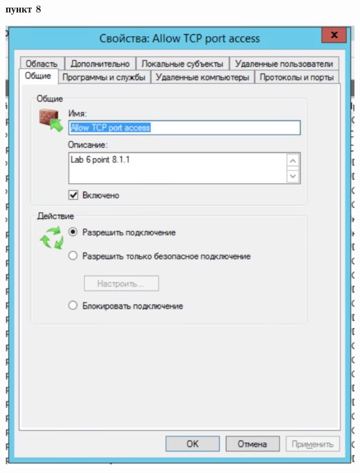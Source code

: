 \documentclass[a4paper,14pt]{extarticle}
\begin{document}
    \newpage
    \textbf{пункт 8}
    \begin{center}
        \includegraphics[scale=0.7]{8.1.1.png}
    \end{center}
\end{document}
